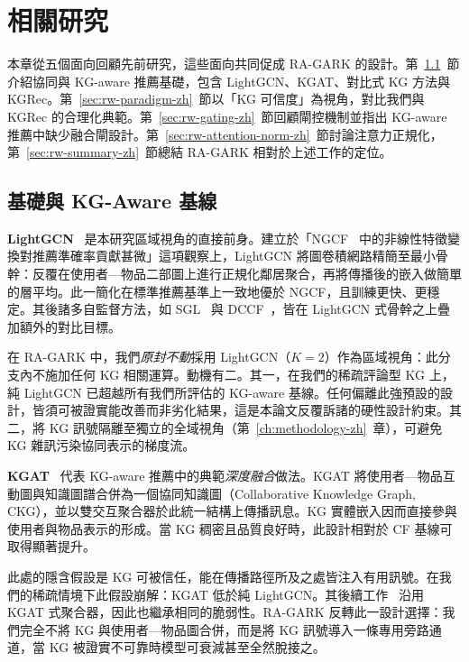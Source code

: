 \chapter{相關研究}
\label{ch:relatedwork-zh}

本章從五個面向回顧先前研究，這些面向共同促成 RA-GARK 的設計。第~\ref{sec:rw-foundations-zh}~節介紹協同與 KG-aware 推薦基礎，包含 LightGCN、KGAT、對比式 KG 方法與 KGRec。第~\ref{sec:rw-paradigm-zh}~節以「KG 可信度」為視角，對比我們與 KGRec 的合理化典範。第~\ref{sec:rw-gating-zh}~節回顧閘控機制並指出 KG-aware 推薦中缺少融合閘設計。第~\ref{sec:rw-attention-norm-zh}~節討論注意力正規化，第~\ref{sec:rw-summary-zh}~節總結 RA-GARK 相對於上述工作的定位。

\section{基礎與 KG-Aware 基線}
\label{sec:rw-foundations-zh}

\textbf{LightGCN}~\cite{he2020lightgcn} 是本研究區域視角的直接前身。建立於「NGCF~\cite{wang2019ngcf} 中的非線性特徵變換對推薦準確率貢獻甚微」這項觀察上，LightGCN 將圖卷積網路精簡至最小骨幹：反覆在使用者—物品二部圖上進行正規化鄰居聚合，再將傳播後的嵌入做簡單的層平均。此一簡化在標準推薦基準上一致地優於 NGCF，且訓練更快、更穩定。其後諸多自監督方法，如 SGL~\cite{wu2021sgl} 與 DCCF~\cite{ren2023dccf}，皆在 LightGCN 式骨幹之上疊加額外的對比目標。

在 RA-GARK 中，我們\emph{原封不動}採用 LightGCN（$K=2$）作為區域視角：此分支內不施加任何 KG 相關運算。動機有二。其一，在我們的稀疏評論型 KG 上，純 LightGCN 已超越所有我們所評估的 KG-aware 基線。任何偏離此強預設的設計，皆須可被證實能改善而非劣化結果，這是本論文反覆訴諸的硬性設計約束。其二，將 KG 訊號隔離至獨立的全域視角（第~\ref{ch:methodology-zh}~章），可避免 KG 雜訊污染協同表示的梯度流。

\textbf{KGAT}~\cite{wang2019kgat} 代表 KG-aware 推薦中的典範\emph{深度融合}做法。KGAT 將使用者—物品互動圖與知識圖譜合併為一個協同知識圖（Collaborative Knowledge Graph, CKG），並以雙交互聚合器於此統一結構上傳播訊息。KG 實體嵌入因而直接參與使用者與物品表示的形成。當 KG 稠密且品質良好時，此設計相對於 CF 基線可取得顯著提升。

此處的隱含假設是 KG 可被信任，能在傳播路徑所及之處皆注入有用訊號。在我們的稀疏情境下此假設崩解：KGAT 低於純 LightGCN。其後續工作~\cite{yang2022kgcl, zou2022mcclk, yang2023kgrec} 沿用 KGAT 式聚合器，因此也繼承相同的脆弱性。RA-GARK 反轉此一設計選擇：我們完全不將 KG 與使用者—物品圖合併，而是將 KG 訊號導入一條專用旁路通道，當 KG 被證實不可靠時模型可衰減甚至全然脫接之。

